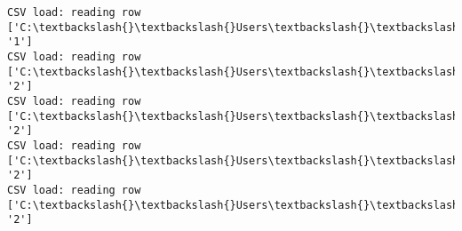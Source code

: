 \documentclass[11pt]{article}
\begin{document}
\begin{Verbatim}[commandchars=\\\{\}]
CSV load: reading row ['C:\textbackslash{}\textbackslash{}Users\textbackslash{}\textbackslash{}AbhishekGangadhar\textbackslash{}\textbackslash{}Downloads\textbackslash{}\textbackslash{}ActionRecog\textbackslash{}\textbackslash{}ActionRecog\textbackslash{}\textbackslash{}DataSets\textbackslash{}\textbackslash{}UCF11\textbackslash{}\textbackslash{}action\_youtube\_naudio\textbackslash{}\textbackslash{}golf\_swing\textbackslash{}\textbackslash{}v\_golf\_09\textbackslash{}\textbackslash{}v\_golf\_09\_04.avi', '1']
CSV load: reading row ['C:\textbackslash{}\textbackslash{}Users\textbackslash{}\textbackslash{}AbhishekGangadhar\textbackslash{}\textbackslash{}Downloads\textbackslash{}\textbackslash{}ActionRecog\textbackslash{}\textbackslash{}ActionRecog\textbackslash{}\textbackslash{}DataSets\textbackslash{}\textbackslash{}UCF11\textbackslash{}\textbackslash{}action\_youtube\_naudio\textbackslash{}\textbackslash{}trampoline\_jumping\textbackslash{}\textbackslash{}v\_jumping\_21\textbackslash{}\textbackslash{}v\_jumping\_21\_01.avi', '2']
CSV load: reading row ['C:\textbackslash{}\textbackslash{}Users\textbackslash{}\textbackslash{}AbhishekGangadhar\textbackslash{}\textbackslash{}Downloads\textbackslash{}\textbackslash{}ActionRecog\textbackslash{}\textbackslash{}ActionRecog\textbackslash{}\textbackslash{}DataSets\textbackslash{}\textbackslash{}UCF11\textbackslash{}\textbackslash{}action\_youtube\_naudio\textbackslash{}\textbackslash{}trampoline\_jumping\textbackslash{}\textbackslash{}v\_jumping\_21\textbackslash{}\textbackslash{}v\_jumping\_21\_02.avi', '2']
CSV load: reading row ['C:\textbackslash{}\textbackslash{}Users\textbackslash{}\textbackslash{}AbhishekGangadhar\textbackslash{}\textbackslash{}Downloads\textbackslash{}\textbackslash{}ActionRecog\textbackslash{}\textbackslash{}ActionRecog\textbackslash{}\textbackslash{}DataSets\textbackslash{}\textbackslash{}UCF11\textbackslash{}\textbackslash{}action\_youtube\_naudio\textbackslash{}\textbackslash{}trampoline\_jumping\textbackslash{}\textbackslash{}v\_jumping\_21\textbackslash{}\textbackslash{}v\_jumping\_21\_03.avi', '2']
CSV load: reading row ['C:\textbackslash{}\textbackslash{}Users\textbackslash{}\textbackslash{}AbhishekGangadhar\textbackslash{}\textbackslash{}Downloads\textbackslash{}\textbackslash{}ActionRecog\textbackslash{}\textbackslash{}ActionRecog\textbackslash{}\textbackslash{}DataSets\textbackslash{}\textbackslash{}UCF11\textbackslash{}\textbackslash{}action\_youtube\_naudio\textbackslash{}\textbackslash{}trampoline\_jumping\textbackslash{}\textbackslash{}v\_jumping\_21\textbackslash{}\textbackslash{}v\_jumping\_21\_04.avi', '2']

\end{Verbatim}
\end{document}
